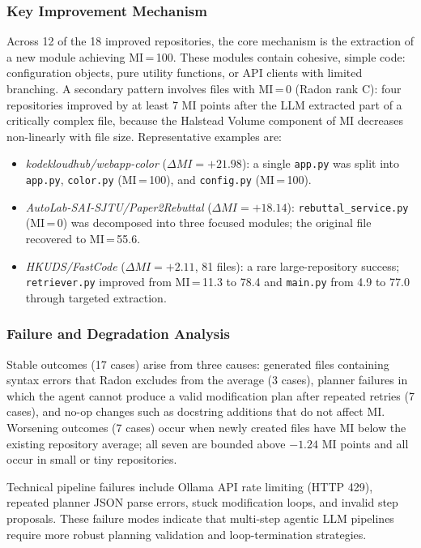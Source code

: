 \subsubsection*{Key Improvement Mechanism}

Across 12 of the 18 improved repositories, the core mechanism is the extraction of a new module achieving MI\,=\,100. These modules contain cohesive, simple code: configuration objects, pure utility functions, or API clients with limited branching. A secondary pattern involves files with MI\,=\,0 (Radon rank C): four repositories improved by at least 7 MI points after the LLM extracted part of a critically complex file, because the Halstead Volume component of MI decreases non-linearly with file size. Representative examples are:

\begin{itemize}[nosep]
    \item \textit{kodekloudhub/webapp-color} ($\Delta MI = +21.98$): a single \texttt{app.py} was split into \texttt{app.py}, \texttt{color.py} (MI\,=\,100), and \texttt{config.py} (MI\,=\,100).
    \item \textit{AutoLab-SAI-SJTU/Paper2Rebuttal} ($\Delta MI = +18.14$): \texttt{rebuttal\_service.py} (MI\,=\,0) was decomposed into three focused modules; the original file recovered to MI\,=\,55.6.
    \item \textit{HKUDS/FastCode} ($\Delta MI = +2.11$, 81 files): a rare large-repository success; \texttt{retriever.py} improved from MI\,=\,11.3 to 78.4 and \texttt{main.py} from 4.9 to 77.0 through targeted extraction.
\end{itemize}

\subsubsection*{Failure and Degradation Analysis}

Stable outcomes (17 cases) arise from three causes: generated files containing syntax errors that Radon excludes from the average (3 cases), planner failures in which the agent cannot produce a valid modification plan after repeated retries (7 cases), and no-op changes such as docstring additions that do not affect MI. Worsening outcomes (7 cases) occur when newly created files have MI below the existing repository average; all seven are bounded above $-1.24$ MI points and all occur in small or tiny repositories.

Technical pipeline failures include Ollama API rate limiting (HTTP 429), repeated planner JSON parse errors, stuck modification loops, and invalid step proposals. These failure modes indicate that multi-step agentic LLM pipelines require more robust planning validation and loop-termination strategies.


